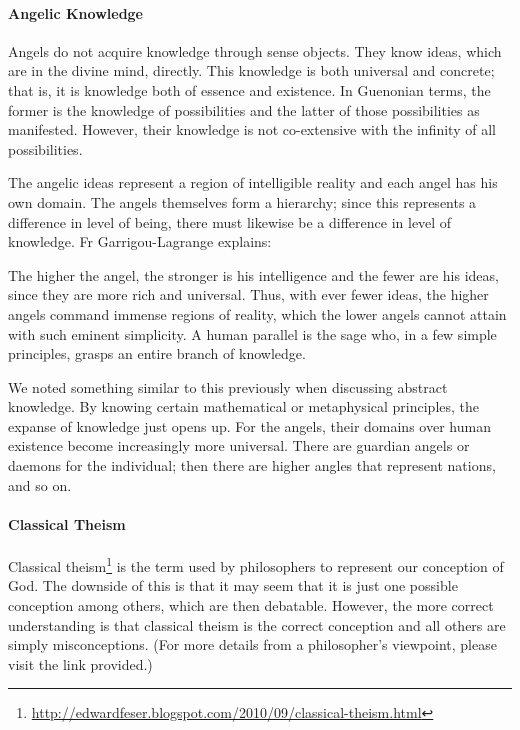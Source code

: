 \paragraph{Angelic Knowledge}
Angels do not acquire knowledge through sense objects. They know ideas, which are in the divine mind, directly. This knowledge is both universal and concrete; that is, it is knowledge both of essence and existence. In Guenonian terms, the former is the knowledge of possibilities and the latter of those possibilities as manifested. However, their knowledge is not co-extensive with the infinity of all possibilities.

The angelic ideas represent a region of intelligible reality and each angel has his own domain. The angels themselves form a hierarchy; since this represents a difference in level of being, there must likewise be a difference in level of knowledge. Fr Garrigou-Lagrange explains:

\begin{quotex}
The higher the angel, the stronger is his intelligence and the fewer are his ideas, since they are more rich and universal. Thus, with ever fewer ideas, the higher angels command immense regions of reality, which the lower angels cannot attain with such eminent simplicity. A human parallel is the sage who, in a few simple principles, grasps an entire branch of knowledge.

\end{quotex}
We noted something similar to this previously when discussing abstract knowledge. By knowing certain mathematical or metaphysical principles, the expanse of knowledge just opens up. For the angels, their domains over human existence become increasingly more universal. There are guardian angels or daemons for the individual; then there are higher angles that represent nations, and so on.

\paragraph{Classical Theism}
Classical theism\footnote{\url{http://edwardfeser.blogspot.com/2010/09/classical-theism.html}} is the term used by philosophers to represent our conception of God. The downside of this is that it may seem that it is just one possible conception among others, which are then debatable. However, the more correct understanding is that classical theism is the correct conception and all others are simply misconceptions. (For more details from a philosopher's viewpoint, please visit the link provided.)

